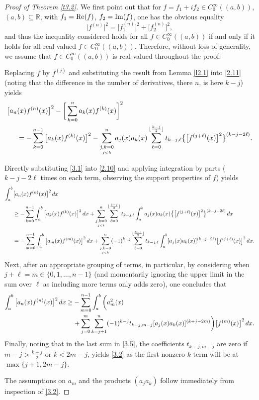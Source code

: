 \documentclass[reqno,10pt,centertags]{amsart}
\newcommand{\bbR}{{\mathbb{R}}}
\renewcommand{\Re}{\text{\rm Re}}
\renewcommand{\Im}{\text{\rm Im}}
\numberwithin{equation}{section}
\theoremstyle{remark}
\begin{document}
\begin{proof}[Proof of Theorem \ref{t3.2}]
We first point out that for $f = f_1 + i f_2 \in C_0^\infty((a,b))$, $(a,b)\subseteq\bbR$, with $f_1 = \Re(f)$, $f_2 = \Im(f)$, one has the obvious equality
\begin{equation}
\big|f^{(n)}\big|^2 = \big[f_1^{(n)}\big]^2 + \big[f_2^{(n)}\big]^2,
\end{equation}
and thus the inequality considered holds for all 
$f \in C^{\infty}_0((a,b))$ if and only if it holds for all real-valued 
$f \in C^{\infty}_0((a,b))$. Therefore, without loss of generality, we assume that $f\in C^\infty_0((a,b))$ is real-valued throughout the proof. 

Replacing $f$ by $f^{(j)}$ and substituting the result from Lemma \ref{l2.1} into \eqref{2.11} (noting that the difference in the number of derivatives, there $n$, is here $k-j$) yields
\begin{align}\label{3.1}
\big[a_n&(x)f^{(n)}(x)\big]^2-\bigg[\sum_{k=0}^n a_k(x) f^{(k)}(x)\bigg]^2\\
&=-\sum_{k=0}^{n-1} \big[a_k(x)f^{(k)}(x)\big]^2-\sum_{\underset{j< k}{j,k=0}}^n a_j(x)a_k(x) \sum_{\ell=0}^{\lfloor \frac{k-j}{2}\rfloor} t_{k-j,\ell} \big\{\big[f^{(j+\ell)}(x)\big]^2\big\}^{(k-j-2\ell)}.\notag
\end{align}

Directly substituting \eqref{3.1} into \eqref{2.10} and applying integration by parts ($k-j-2\ell$ times on each term, observing the support properties of $f$) yields
\begin{align}\label{2.21a}
\int_a^b &\big[a_n(x)f^{(n)}(x)\big]^2\, dx\\
&\geq -\sum_{k=0}^{n-1}\int_a^b \big[a_k(x)f^{(k)}(x)\big]^2\, dx+\sum_{\underset{j< k}{j,k=0}}^n \sum_{\ell=0}^{\lfloor \frac{k-j}{2}\rfloor} t_{k-j,\ell}\int_a^b a_j(x)a_k(x) \big\{\big[f^{(j+\ell)}(x)\big]^2\big\}^{(k-j-2\ell)}\, dx \notag\\
&=-\sum_{m=0}^{n-1} \int_a^b\big[a_m(x)f^{(m)}(x)\big]^2\, dx 
 +\sum_{\underset{j< k}{j,k=0}}^n  (-1)^{k-j} \sum_{\ell=0}^{\lfloor \frac{k-j}{2}\rfloor} t_{k-j,\ell} \int_a^b[a_j(x)a_k(x)]^{(k-j-2\ell)}\big[f^{(j+\ell)}(x)\big]^2\, dx.  \notag
\end{align}
Next, after an appropriate grouping of terms, in particular, by considering when $j+\ell=m\in\{0,1,\dots,n-1\}$ (and momentarily ignoring the upper limit in the sum over $\ell$ as including more terms only adds zero), one concludes that
\begin{align}\label{3.5}
\int_a^b \big[a_n(x)f^{(n)} (x)\big]^2 \, dx&\geq -\sum_{m=0}^{n-1}\int_a^b \bigg(a_m^2(x) \\
&\quad \, +\sum_{j=0}^m \sum_{k=j+1}^n (-1)^{k-j} t_{k-j,m-j} [a_j(x)a_k(x)]^{(k+j-2m)}\bigg)\big[f^{(m)}(x)\big]^2\, dx. \notag
\end{align}
Finally, noting that in the last sum in \eqref{3.5}, the coefficients $t_{k-j,m-j}$ are zero if $m-j>\tfrac{k-j}{2}$ or $k<2m-j$, yields \eqref{3.2} as the first nonzero $k$ term will be at $\max\{j+1,2m-j\}$.

The assumptions on $a_m$ and the products $(a_j a_k)$ follow immediately from inspection of \eqref{3.2}.
\end{proof}
\end{document}
